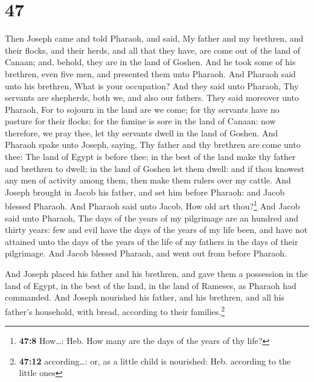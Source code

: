 \hypertarget{section-46}{%
\section{47}\label{section-46}}

 Then Joseph came and told Pharaoh, and said, My father
and my brethren, and their flocks, and their herds, and all that they
have, are come out of the land of Canaan; and, behold, they are in the
land of Goshen.  And he took some of his brethren, even
five men, and presented them unto Pharaoh.  And Pharaoh
said unto his brethren, What is your occupation? And they said unto
Pharaoh, Thy servants are shepherds, both we, and also our fathers.
 They said moreover unto Pharaoh, For to sojourn in the
land are we come; for thy servants have no pasture for their flocks; for
the famine is sore in the land of Canaan: now therefore, we pray thee,
let thy servants dwell in the land of Goshen.  And Pharaoh
spake unto Joseph, saying, Thy father and thy brethren are come unto
thee:  The land of Egypt is before thee; in the best of
the land make thy father and brethren to dwell; in the land of Goshen
let them dwell: and if thou knowest any men of activity among them, then
make them rulers over my cattle.  And Joseph brought in
Jacob his father, and set him before Pharaoh: and Jacob blessed Pharaoh.
 And Pharaoh said unto Jacob, How old art thou?\footnote{\textbf{47:8}
  How\ldots: Heb. How many are the days of the years of thy life?}
 And Jacob said unto Pharaoh, The days of the years of my
pilgrimage are an hundred and thirty years: few and evil have the days
of the years of my life been, and have not attained unto the days of the
years of the life of my fathers in the days of their pilgrimage.
 And Jacob blessed Pharaoh, and went out from before
Pharaoh.

 And Joseph placed his father and his brethren, and gave
them a possession in the land of Egypt, in the best of the land, in the
land of Rameses, as Pharaoh had commanded.  And Joseph
nourished his father, and his brethren, and all his father's household,
with bread, according to their families.\footnote{\textbf{47:12}
  according\ldots: or, as a little child is nourished: Heb. according to
  the little ones}

